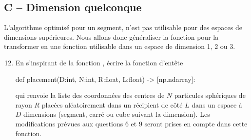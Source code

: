\documentclass[twoside,french,11pt]{VcCours}
\begin{document}
\subsection*{C -- Dimension quelconque}
L'algorithme optimisé pour un segment, n'est pas utilisable pour des espaces de dimensions supérieures. Nous
allons donc généraliser la fonction  pour la transformer en une fonction utilisable dans un espace
de dimension 1, 2 ou 3.
\begin{enumerate}\setcounter{enumi}{11}
  \item
En s'inspirant de la fonction , écrire la fonction d'entête
\lstset{xleftmargin=0.7cm,xrightmargin=0.7cm}
\begin{Python*}
def placement(D:int, N:int, R:float, L:float) -> [np.ndarray]:
\end{Python*}
qui renvoie la liste des coordonnées des centres de $N$ particules sphériques de rayon $R$ placées aléatoirement dans
un récipient de côté $L$ dans un espace à $D$ dimensions (segment, carré ou cube suivant la dimension). Les modifications prévues aux questions 6 et 9 seront
prises en compte dans cette fonction.
\end{enumerate}
\end{document}
